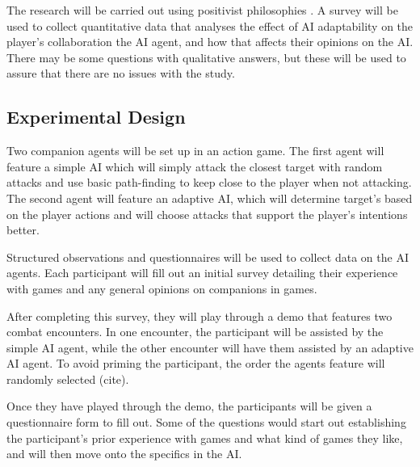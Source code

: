 \documentclass{IEEEtran}
\begin{document}
The research will be carried out using positivist philosophies \cite{Zukauskas18}. A survey will be used to collect quantitative data that analyses the effect of AI adaptability on the player's collaboration the AI agent, and how that affects their opinions on the AI. There may be some questions with qualitative answers, but these will be used to assure that there are no issues with the study.

\subsection{Experimental Design}
\label{ExperimentalDesign}



Two companion agents will be set up in an action game. The first agent will feature a simple AI which will simply attack the closest target with random attacks and use basic path-finding to keep close to the player when not attacking. The second agent will feature an adaptive AI, which will determine target's based on the player actions and will choose attacks that support the player's intentions better.

Structured observations and questionnaires will be used to collect data on the AI agents. Each participant will fill out an initial survey detailing their experience with games and any general opinions on companions in games.

After completing this survey, they will play through a demo that features two combat encounters. In one encounter, the participant will be assisted by the simple AI agent, while the other encounter will have them assisted by an adaptive AI agent. To avoid priming the participant, the order the agents feature will randomly selected (cite).



Once they have played through the demo, the participants will be given a questionnaire form to fill out. Some of the questions would start out establishing the participant's prior experience with games and what kind of games they like, and will then move onto the specifics in the AI.
\end{document}
